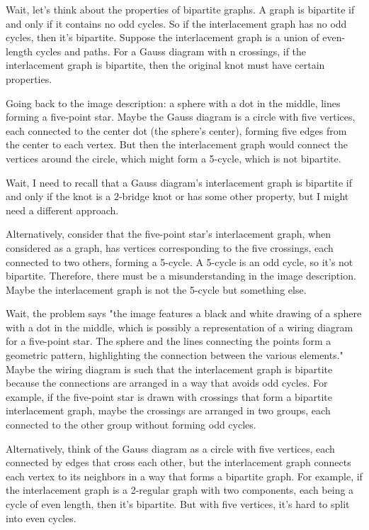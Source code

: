 Wait, let's think about the properties of bipartite graphs. A graph is bipartite if and only if it contains no odd cycles. So if the interlacement graph has no odd cycles, then it's bipartite. Suppose the interlacement graph is a union of even-length cycles and paths. For a Gauss diagram with n crossings, if the interlacement graph is bipartite, then the original knot must have certain properties. 

Going back to the image description: a sphere with a dot in the middle, lines forming a five-point star. Maybe the Gauss diagram is a circle with five vertices, each connected to the center dot (the sphere's center), forming five edges from the center to each vertex. But then the interlacement graph would connect the vertices around the circle, which might form a 5-cycle, which is not bipartite. 

Wait, I need to recall that a Gauss diagram's interlacement graph is bipartite if and only if the knot is a 2-bridge knot or has some other property, but I might need a different approach. 

Alternatively, consider that the five-point star's interlacement graph, when considered as a graph, has vertices corresponding to the five crossings, each connected to two others, forming a 5-cycle. A 5-cycle is an odd cycle, so it's not bipartite. Therefore, there must be a misunderstanding in the image description. Maybe the interlacement graph is not the 5-cycle but something else. 

Wait, the problem says "the image features a black and white drawing of a sphere with a dot in the middle, which is possibly a representation of a wiring diagram for a five-point star. The sphere and the lines connecting the points form a geometric pattern, highlighting the connection between the various elements." Maybe the wiring diagram is such that the interlacement graph is bipartite because the connections are arranged in a way that avoids odd cycles. For example, if the five-point star is drawn with crossings that form a bipartite interlacement graph, maybe the crossings are arranged in two groups, each connected to the other group without forming odd cycles. 

Alternatively, think of the Gauss diagram as a circle with five vertices, each connected by edges that cross each other, but the interlacement graph connects each vertex to its neighbors in a way that forms a bipartite graph. For example, if the interlacement graph is a 2-regular graph with two components, each being a cycle of even length, then it's bipartite. But with five vertices, it's hard to split into even cycles. 

